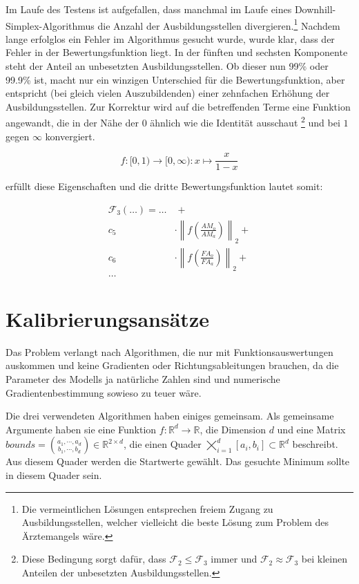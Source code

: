 \documentclass[a4paper,12pt]{article}
\begin{document}
Im Laufe des Testens ist aufgefallen, dass manchmal im Laufe eines Downhill-Simplex-Algorithmus die Anzahl der Ausbildungsstellen divergieren.\footnote{Die vermeintlichen Lösungen entsprechen freiem Zugang zu Ausbildungsstellen, welcher vielleicht die beste Lösung zum Problem des Ärztemangels wäre.} Nachdem lange erfolglos ein Fehler im Algorithmus gesucht wurde, wurde klar, dass der Fehler in der Bewertungsfunktion liegt. In der fünften und sechsten Komponente steht der Anteil an unbesetzten Ausbildungsstellen. Ob dieser nun 99\% oder 99.9\% ist, macht nur ein winzigen Unterschied für die Bewertungsfunktion, aber entspricht (bei gleich vielen Auszubildenden) einer zehnfachen Erhöhung der Ausbildungsstellen. Zur Korrektur wird auf die betreffenden Terme eine Funktion angewandt, die in der Nähe der $0$ ähnlich wie die Identität ausschaut \footnote{Diese Bedingung sorgt dafür, dass $\mathcal F_2 \leq \mathcal F_3$ immer und $\mathcal F_2 \approx \mathcal F_3$ bei kleinen Anteilen der unbesetzten Ausbildungsstellen.} und bei $1$ gegen $\infty$ konvergiert.

\begin{equation*}
f: [0,1) \rightarrow [0,\infty) : x \mapsto \frac{x}{1-x}
\end{equation*}

erfüllt diese Eigenschaften und die dritte Bewertungsfunktion lautet somit:

\begin{align*}
\mathcal F_3(\hdots) = \hdots & \hspace{4pt} + \\
			c_5 &\cdot \left\| f\left( \frac{AM_o}{AM_a} \right) \right\|_2 +\\
			c_6 &\cdot \left\| f\left( \frac{FA_o}{FA_a} \right) \right\|_2 +\\
			 \hdots &
\end{align*}


\newpage

\section{Kalibrierungsansätze}

Das Problem verlangt nach Algorithmen, die nur mit Funktionsauswertungen auskommen und keine Gradienten oder Richtungsableitungen brauchen, da die Parameter des Modells ja natürliche Zahlen sind und numerische Gradientenbestimmung sowieso zu teuer wäre.

Die drei verwendeten Algorithmen haben einiges gemeinsam. Als gemeinsame Argumente haben sie eine Funktion $f: \mathbb{R}^d \rightarrow \mathbb{R}$, die Dimension $d$ und eine Matrix $bounds = \binom{a_1, \cdots, a_d}{b_1, \cdots, b_d} \in \mathbb{R}^{2\times d}$, die einen Quader $\bigtimes\nolimits_{i=1}^d [a_i, b_i] \subset \mathbb{R}^d$ beschreibt. Aus diesem Quader werden die Startwerte gewählt. Das gesuchte Minimum sollte in diesem Quader sein. 
\end{document}
